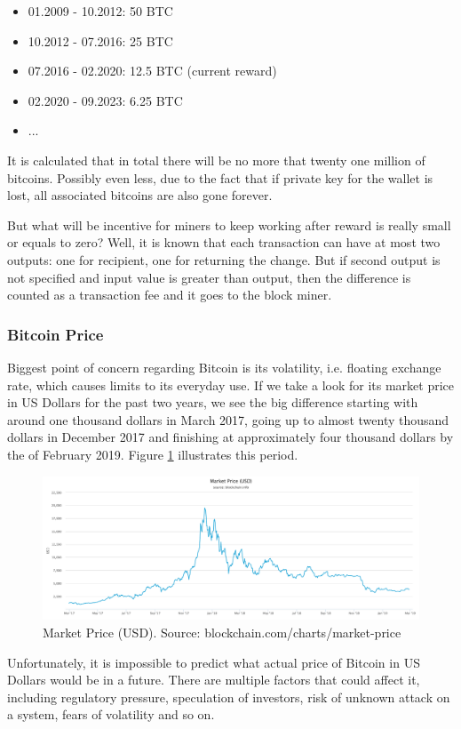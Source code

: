 \documentclass[conference,compsoc]{IEEEtran}
\begin{document}
\begin{itemize}
    \item 01.2009 - 10.2012: 50 BTC
    \item 10.2012 - 07.2016: 25 BTC
    \item 07.2016 - 02.2020: 12.5 BTC (current reward)
    \item 02.2020 - 09.2023: 6.25 BTC
    \item ...
\end{itemize}

It is calculated that in total there will be no more that twenty one million of bitcoins. 
Possibly even less, due to the fact that if private key for the wallet is lost, all associated bitcoins are also gone forever. 

But what will be incentive for miners to keep working after reward is really small or equals to zero? 
Well, it is known that each transaction can have at most two outputs: one for recipient, one for returning the change. 
But if second output is not specified and input value is greater than output, then the difference is counted as a transaction fee and it goes to the block miner.

\subsubsection{Bitcoin Price}
Biggest point of concern regarding Bitcoin is its volatility, i.e.  floating exchange rate, which causes limits to its everyday use.
If we take a look for its market price in US Dollars for the past two years, we see the big difference starting with around one thousand dollars in March 2017, going up to almost twenty thousand dollars in December 2017 and finishing at approximately four thousand dollars by the of February 2019. 
Figure \ref{fig:price} illustrates this period.

\begin{figure}[h!]
  \centering
  \includegraphics[width=.45\textwidth]{graphics/price.png}
  \caption[Caption]{Market Price (USD). Source: blockchain.com/charts/market-price}
  \label{fig:price}
\end{figure}

Unfortunately, it is impossible to predict what actual price of Bitcoin in US Dollars would be in a future. 
There are multiple factors that could affect it, including regulatory pressure, speculation of investors, risk of unknown attack on a system, fears of volatility and so on. 
\end{document}
